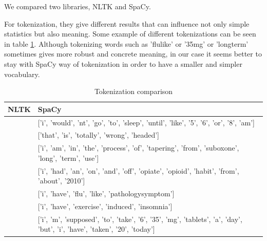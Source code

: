 \documentclass[11pt]{article}
\begin{document}

We compared two libraries, NLTK and SpaCy.

For tokenization, they give different results that can influence not only simple statistics but also meaning. Some example of different tokenizations can be seen in table \ref{token_dif}. Although tokenizing  words such as 'flulike' or '35mg' or 'longterm' sometimes gives more robust and concrete meaning, in our case it seems better to stay with SpaCy way of tokenization in order to have a smaller and simpler vocabulary.

\begin{center}
\begin{table}
\begin{tabular}{ |p{7cm}|p{7cm}| }
\hline
NLTK & SpaCy \\ \hline
['i', 'wouldnt', 'go', 'to', 'sleep', 'until', 'like', '5', '6', 'or', '8am'] & 
['i', 'would', 'nt', 'go', 'to', 'sleep', 'until', 'like', '5', '6', 'or', '8', 'am'] \\ \hline
['that', 'is', 'totally', 'wrongheaded'] & ['that', 'is', 'totally', 'wrong', 'headed'] \\ \hline
['i', 'am', 'in', 'the', 'process', 'of', 'tapering', 'from', 'suboxone', 'longterm', 'use'] & 
['i', 'am', 'in', 'the', 'process', 'of', 'tapering', 'from', 'suboxone', 'long', 'term', 'use'] \\ \hline
['i', 'had', 'an', 'onandoff', 'opiateopioid', 'habit', 'from', 'about', '2010'] & 
['i', 'had', 'an', 'on', 'and', 'off', 'opiate', 'opioid', 'habit', 'from', 'about', '2010'] \\ 
\hline
['i', 'have', 'flulike', 'pathologysymptom'] & ['i', 'have', 'flu', 'like', 'pathologysymptom'] \\ \hline
['i', 'have', 'exerciseinduced', 'insomnia'] & ['i', 'have', 'exercise', 'induced', 'insomnia'] \\ \hline
['i', 'm', 'supposed', 'to', 'take', '6', '35mg', 'tablets', 'a', 'day', 'but', 'i', 'have', 'taken', '20', 'today'] & 
['i', 'm', 'supposed', 'to', 'take', '6', '35', 'mg', 'tablets', 'a', 'day', 'but', 'i', 'have', 'taken', '20', 'today'] \\ 
\hline
\end{tabular}	
\caption{Tokenization comparison}\label{token_dif}
\end{table}
\end{center}
\FloatBarrier
\end{document}

